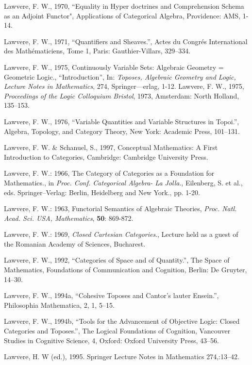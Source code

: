 \documentclass[12pt]{article}
\begin{document}
\begin{thebibliography}{399}
Lawvere, F. W., 1970, ``Equality in Hyper doctrines and Comprehension Schema as an Adjoint Functor", Applications of Categorical Algebra, Providence: AMS, 1-14.  

Lawvere, F. W., 1971, ``Quantifiers and Sheaves.'', Actes du Congr\'es International des 
Math\'ematiciens, Tome 1, Paris: Gauthier-Villars, 329--334.   

Lawvere, F. W., 1975, Continuously Variable Sets: Algebraic Geometry = Geometric Logic., 
``Introduction'', In: {\em Toposes, Algebraic Geometry and Logic, Lecture Notes in Mathematics}, 274, Springer---erlag, 1-12. Lawvere, F. W., 1975, {\em Proceedings of the Logic Colloquium Bristol}, 1973, Amsterdam: North Holland, 
135--153.

Lawvere, F. W., 1976, ``Variable Quantities and Variable Structures in Topoi.'', Algebra, Topology, and Category Theory, New York: Academic Press, 101--131. 

Lawvere, F. W. \& Schanuel, S., 1997, Conceptual Mathematics: A First Introduction to Categories, Cambridge: Cambridge University Press. 

Lawvere, F. W.: 1966, The Category of Categories as a Foundation for Mathematics., in
\emph{Proc. Conf. Categorical Algebra- La Jolla}., Eilenberg, S. et al., eds. Springer--Verlag:
Berlin, Heidelberg and New York., pp. 1-20.

Lawvere, F. W.: 1963, Functorial Semantics of Algebraic Theories,
\emph{Proc. Natl. Acad. Sci. USA, Mathematics}, \textbf{50}: 869-872.

Lawvere, F. W.: 1969, \emph{Closed Cartesian Categories}., Lecture held as a guest of the
Romanian Academy of Sciences, Bucharest.

Lawvere, F. W., 1992, ``Categories of Space and of Quantity.'', The Space of Mathematics, Foundations of Communication and Cognition, Berlin: De Gruyter, 14--30.  

Lawvere, F. W., 1994a, ``Cohesive Toposes and Cantor's lauter Ensein.'', Philosophia Mathematica, 2, 1, 5--15. 

Lawvere, F. W., 1994b, ``Tools for the Advancement of Objective Logic: Closed Categories and Toposes.'', The Logical Foundations of Cognition, Vancouver Studies in Cognitive Science, 4, Oxford: Oxford University Press, 43--56.  

Lawvere, H. W (ed.), 1995. Springer Lecture Notes in Mathematics 274,:13--42. 


\end{thebibliography}
\end{document}
